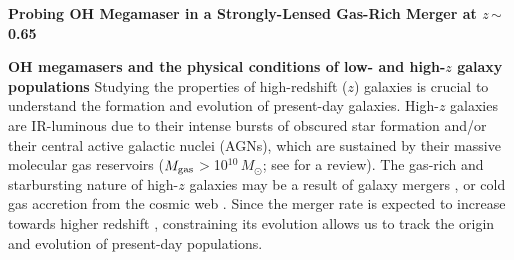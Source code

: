 \documentclass[letterpaper,11pt]{article}
\newcommand{\Msun}{\mbox{$M_{\odot}$}\xspace}
\newcommand{\ssim}{\,$\sim$\,}
\newcommand{\highz}{high-$z$\space}
\newcommand{\galpop}{galaxy populations\xspace}
\begin{document}
\pagestyle{plain}



\begin{center}
{\large{\bf{Probing OH Megamaser in a Strongly-Lensed Gas-Rich Merger at $z$\ssim0.65}}}
\end{center}
\vspace{-.8em}
\textbf{OH megamasers and the physical conditions of low- and high-$z$ \galpop}
Studying the properties of high-redshift ($z$) galaxies is crucial to understand the formation and evolution of present-day galaxies.
High-$z$ galaxies are IR-luminous due to their intense bursts
of obscured star formation and/or their central active galactic nuclei (AGNs),
which are sustained by their massive molecular gas reservoirs ($M_{\rm gas}$$>$10$^{10}$\,\Msun; see \citealt{CW13} for a review).
The gas-rich and starbursting nature of high-$z$ galaxies may be a result of galaxy mergers
\citep{Riechers11a, Hayward12a, Riechers13b}, or cold gas accretion from the cosmic web \citep[e.g.,][]{Dekel09b}.
Since the merger rate is expected to increase towards higher redshift \citep[e.g.,][]{LeFloch05a, Magnelli09a}, constraining
its evolution allows us to track the origin and evolution of present-day populations. %

\end{document}
